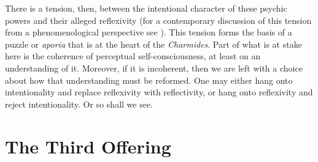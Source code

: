 There is a tension, then, between the intentional character of these psychic powers and their alleged reflexivity (for a contemporary discussion of this tension from a phenomenological perspective see \citealt{Zahavi:1999aa}). This tension forms the basis of a puzzle or \emph{aporia} that is at the heart of the \emph{Charmides}. Part of what is at stake here is the coherence of perceptual self-consciousness, at least on an understanding of it. Moreover, if it is incoherent, then we are left with a choice about how that understanding must be reformed. One may either hang onto intentionality and replace reflexivity with reflectivity, or hang onto reflexivity and reject intentionality. Or so shall we see.


\section{The Third Offering} %
\label{sec:the_third_offering}

